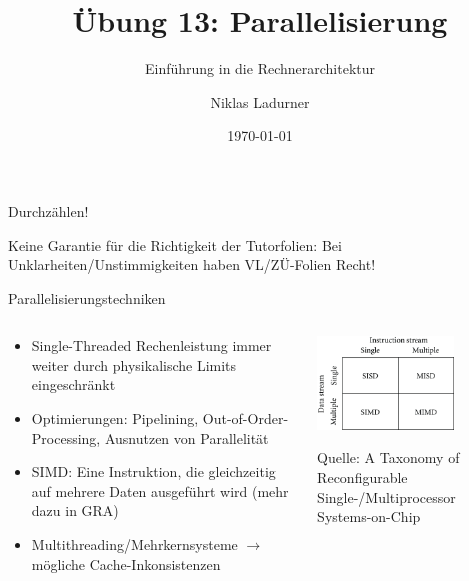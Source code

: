 \documentclass[
  german,            %
  aspectratio=169,    %
]{tumbeamer}
\title{Übung 13: Parallelisierung}
\subtitle{Einführung in die Rechnerarchitektur}
\author{Niklas Ladurner}
\institute{\theChairName\\\theDepartmentName\\\theUniversityName}
\date[\today]{\today}
\begin{document}
\maketitle

\begin{frame}[c]{}{}
  \begin{center}
    \LARGE  Durchzählen!
  \end{center}
\end{frame}

\begin{frame}[c]{}{}
  \begin{center}
    \LARGE  Keine Garantie für die Richtigkeit der Tutorfolien: Bei Unklarheiten/Unstimmigkeiten
    haben VL/ZÜ-Folien Recht!
  \end{center}
\end{frame}

\begin{frame}[fragile, c]{Parallelisierungstechniken}{}
  \begin{columns}[c]
    \begin{column}{0.5\textwidth}
      \begin{itemize}
        \item Single-Threaded Rechenleistung immer weiter durch physikalische Limits eingeschränkt
        \item Optimierungen: Pipelining, Out-of-Order-Processing, Ausnutzen von Parallelität
        \item SIMD: Eine Instruktion, die gleichzeitig auf mehrere Daten ausgeführt wird (mehr dazu in GRA)
        \item Multithreading/Mehrkernsysteme $\rightarrow$ mögliche Cache-Inkonsistenzen
      \end{itemize}
    \end{column}
    \begin{column}{0.5\textwidth}
      \begin{center}
        \includegraphics[width=0.7\textwidth]{w13_flynn.png}
      \end{center}
      \centering
      \tiny{Quelle: A Taxonomy of Reconfigurable Single-/Multiprocessor\\Systems-on-Chip}
    \end{column}
  \end{columns}
\end{frame}
\end{document}
